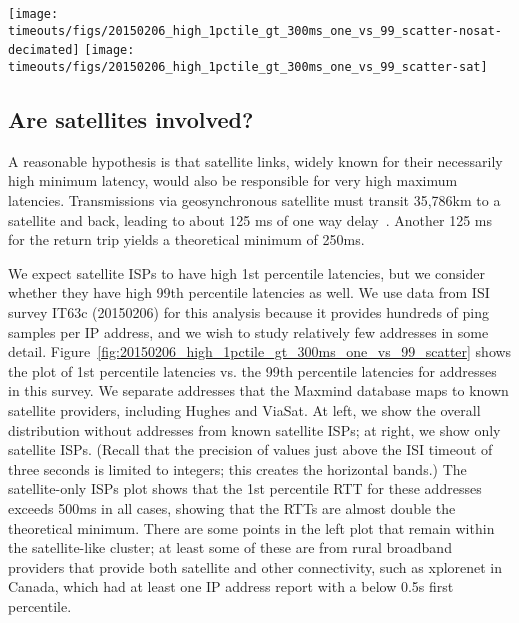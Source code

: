 \begin{figure*}
\begin{center}
\texttt{[image: timeouts/figs/20150206\_high\_1pctile\_gt\_300ms\_one\_vs\_99\_scatter-nosat-decimated]}
\hspace{0.3in}\texttt{[image: timeouts/figs/20150206\_high\_1pctile\_gt\_300ms\_one\_vs\_99\_scatter-sat]}
\end{center}
\caption{\label{fig:20150206_high_1pctile_gt_300ms_one_vs_99_scatter}Scatterplot of 1st and 99th percentile latencies for addresses with high values of both in survey IT63c; Left omits satellite-only ISPs; Right includes only satellite-only ISPs.}
\end{figure*}


\subsection{Are satellites involved?}

A reasonable hypothesis is that satellite links, widely
known for their necessarily high minimum latency, would also
be responsible for very high maximum latencies.
Transmissions via
geosynchronous satellite must transit 35,786km to a
satellite and back, leading to about 125 ms of one way
delay~\cite{minei-jsac99,barakat-geostationary}.  Another 125 ms for
the return trip yields a theoretical minimum
of 250ms. 

We expect satellite ISPs to have
high 1st percentile latencies, but we consider whether they
have high 99th percentile latencies as well. We use data from ISI survey IT63c
(20150206) for this analysis because it provides hundreds of ping samples per IP address, and we wish to study relatively few addresses in some detail. Figure~\ref{fig:20150206_high_1pctile_gt_300ms_one_vs_99_scatter}
shows the plot of 1st percentile latencies vs. the 99th percentile
latencies for addresses in this survey. We
separate addresses that the Maxmind database maps to
known satellite providers, including Hughes and ViaSat.  At left, we
show the overall distribution without addresses from known satellite
ISPs; at right, we show only satellite ISPs.  (Recall that the
precision of values just above the ISI timeout of three seconds is
limited to integers; this creates the horizontal bands.)  The
satellite-only ISPs plot shows that the 1st percentile RTT for these
addresses exceeds 500ms in all cases, showing that the RTTs are almost
double the theoretical minimum. There are
some points in the left plot that remain within the satellite-like
cluster; at least some of these are from rural broadband providers
that provide both satellite and other connectivity, such as xplorenet
in Canada, which had at least one IP address report with a below 0.5s first percentile.

